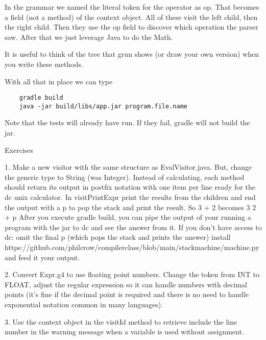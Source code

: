 In the grammar we named the literal token for the operator
as op. That becomes a field (not a method) of the context object.
All of these visit the left child, then the right child. Then they use
the op field to discover which operation the parser saw. After that
we just leverage Java to do the Math.

It is useful to think of the tree that grun shows (or draw your
own version) when you write these methods.

With all that in place we can type

{\footnotesize
\begin{verbatim}
    gradle build
    java -jar build/libs/app.jar program.file.name
\end{verbatim}
}

Note that the tests will already have run. If they fail, gradle will not
build the jar.

Exercises

1. Make a new visitor with the same structure as EvalVisitor.java.
   But, change the generic type to String (was Integer). Instead of
   calculating, each method should return its output in postfix
   notation with one item per line ready for the dc unix calculator.
   In visitPrintExpr print the results from the children and
   end the output with a p to pop the stack and print the result.
   So 3 + 2 becomes
   3
   2
   +
   p
   After you execute gradle build, you can pipe the output of your running
   a program with the jar to dc and see the answer from it.
   If you don't have access to dc:
   omit the final p (which pops the stack and prints the answer)
   install
   https://github.com/philcrow/compilerclass/blob/main/stackmachine/machine.py
   and feed it your output.

2. Convert Expr.g4 to use floating point numbers. Change the token from
   INT to FLOAT, adjust the regular expression so it can handle numbers
   with decimal points (it's fine if the decimal point is required and
   there is no need to handle exponential notation common in many languages).

3. Use the context object in the visitId method to retrieve include
   the line number in the warning message when a variable is used without
   assignment.

